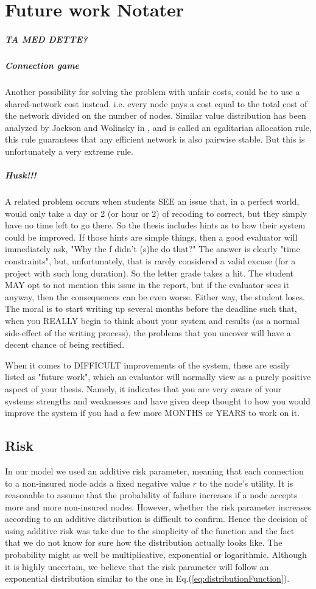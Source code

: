 \section{Future work Notater}
\label{chp:futurework} 
\subparagraph{TA MED DETTE?}


\subparagraph{Connection game}
Another possibility for solving the problem with unfair costs, could be to use a shared-network cost instead. i.e. every node pays a cost equal to the total cost of the network divided on the number of nodes. 
Similar value distribution has been analyzed by Jackson and Wolinsky in \cite{jackson1996strategic}, and is called an egalitarian allocation rule, this rule guarantees that any efficient network is also pairwise stable. But this is unfortunately a very extreme rule.


\subparagraph{Husk!!!}
A related problem occurs when students SEE an issue that, in a perfect world, would only take a day or 2 (or hour or 2) of recoding to correct, but they simply have no time left to go there. So the thesis includes hints as to how their system could be improved. If those hints are simple things, then a good evaluator will immediately ask, "Why the f didn't (s)he do that?" The answer is clearly "time constraints", but, unfortunately, that is rarely considered a valid excuse (for a project with such long duration). So the letter grade takes a hit. The student MAY opt to not mention this issue in the report, but if the evaluator sees it anyway, then the consequences can be even worse. Either way, the student loses. The moral is to start writing up several months before the deadline such that, when you REALLY begin to think about your system and results (as a normal side-effect of the writing process), the problems that you uncover will have a decent chance of being rectified.

When it comes to DIFFICULT improvements of the system, these are easily listed as "future work", which an evaluator will normally view as a purely positive aspect of your thesis. Namely, it indicates that you are very aware of your systems strengths and weaknesses and have given deep thought to how you would improve the system if you had a few more MONTHS or YEARS to work on it.
\subsection{Risk}
In our model we used an additive risk parameter, meaning that each connection to a non-insured node adds a fixed negative value $r$ to the node's utility. It is reasonable to assume that the probability of failure increases if a node accepts more and more non-insured nodes. However, whether the risk parameter increases according to an additive distribution is difficult to confirm. Hence the decision of using additive risk was take due to the simplicity of the function and the fact that we do not know for sure how the distribution actually looks like. The probability might as well be multiplicative, exponential or logarithmic. Although it is highly uncertain, we believe that the risk parameter will follow an exponential distribution similar to the one in Eq.(\ref{eq:distributionFunction}).


